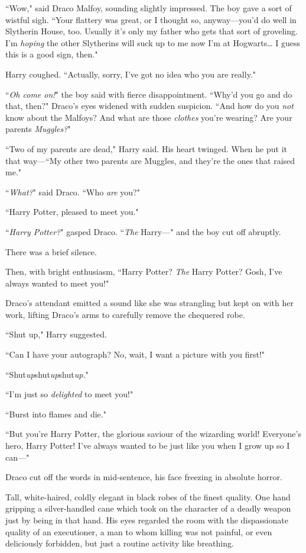``Wow," said Draco Malfoy, sounding slightly impressed. The boy gave a sort of wistful sigh. ``Your flattery was great, or I thought so, anyway—you'd do well in Slytherin House, too. Usually it's only my father who gets that sort of groveling. I'm \emph{hoping} the other Slytherins will suck up to me now I'm at Hogwarts{\ldots} I guess this is a good sign, then."

Harry coughed. ``Actually, sorry, I've got no idea who you are really."

``\emph{Oh come on!}" the boy said with fierce disappointment. ``Why'd you go and do that, then?" Draco's eyes widened with sudden suspicion. ``And how do you \emph{not} know about the Malfoys? And what are those \emph{clothes} you're wearing? Are your parents \emph{Muggles?}"

``Two of my parents are dead," Harry said. His heart twinged. When he put it that way—``My other two parents are Muggles, and they're the ones that raised me."

``\emph{What?}" said Draco. ``Who \emph{are} you?"

``Harry Potter, pleased to meet you."

``\emph{Harry Potter?}" gasped Draco. ``\emph{The} Harry—" and the boy cut off abruptly.

There was a brief silence.

Then, with bright enthusiasm, ``Harry Potter? \emph{The} Harry Potter? Gosh, I've always wanted to meet you!"

Draco's attendant emitted a sound like she was strangling but kept on with her work, lifting Draco's arms to carefully remove the chequered robe.

``Shut up," Harry suggested.

``Can I have your autograph? No, wait, I want a picture with you first!"

``Shut\emph{up}shut\emph{up}shut\emph{up.}"

``I'm just so \emph{delighted} to meet you!"

``Burst into flames and die."

``But you're Harry Potter, the glorious saviour of the wizarding world! Everyone's hero, Harry Potter! I've always wanted to be just like you when I grow up so I can—"

Draco cut off the words in mid-sentence, his face freezing in absolute horror.

Tall, white-haired, coldly elegant in black robes of the finest quality. One hand gripping a silver-handled cane which took on the character of a deadly weapon just by being in that hand. His eyes regarded the room with the dispassionate quality of an executioner, a man to whom killing was not painful, or even deliciously forbidden, but just a routine activity like breathing.

